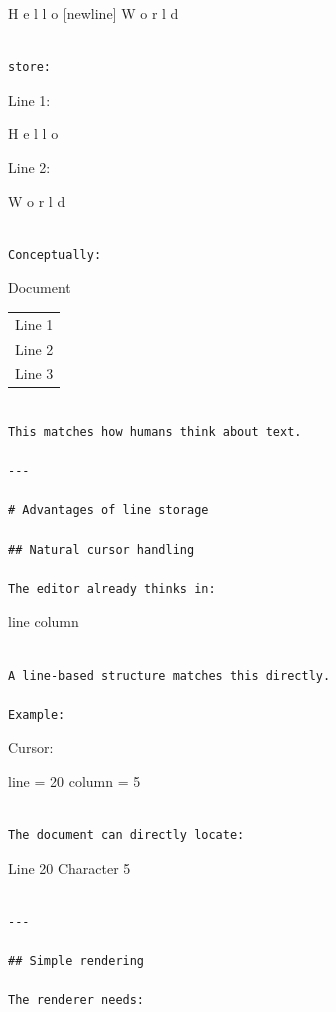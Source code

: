 \documentclass[
  oneside,
  openany]{book}
\begin{document}
H e l l o {[}newline{]} W o r l d

\begin{verbatim}

store:
\end{verbatim}

Line 1:

H e l l o

Line 2:

W o r l d

\begin{verbatim}

Conceptually:
\end{verbatim}

Document

\begin{longtable}[]{@{}
  >{\raggedright\arraybackslash}p{}@{}}
\toprule\noalign{}
\endhead
\bottomrule\noalign{}
\endlastfoot
Line 1 \\
Line 2 \\
Line 3 \\
\end{longtable}

\begin{verbatim}

This matches how humans think about text.

---

# Advantages of line storage

## Natural cursor handling

The editor already thinks in:
\end{verbatim}

line column

\begin{verbatim}

A line-based structure matches this directly.

Example:
\end{verbatim}

Cursor:

line = 20 column = 5

\begin{verbatim}

The document can directly locate:
\end{verbatim}

Line 20 Character 5

\begin{verbatim}

---

## Simple rendering

The renderer needs:
\end{verbatim}
\end{document}
